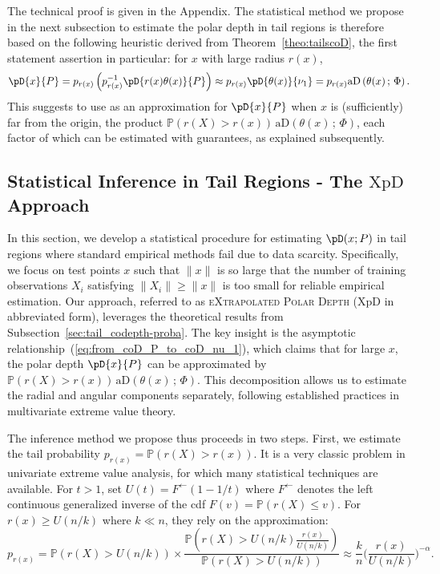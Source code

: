 \documentclass{article}
\numberwithin{equation}{section}
\renewcommand{\P}{\mathbb{P}}
\newcommand{\PP}{\P}%
\newcommand{\XpDsymbol}{\mathrm{XpD}}  %
\newcommand{\XpD}{\ensuremath{\XpDsymbol}}
\newcommand{\coD}[2]{\pD{#1}{#2}}
\newcommand{\aD}[2]{{\mathrm{aD}}\left({#1}\,;\,{#2}\right)}
\begin{document}
The technical proof is given in the Appendix. The statistical method
we propose in the next subsection to estimate the polar depth in tail
regions is therefore based on the following heuristic derived from
Theorem~\ref{theo:tailscoD}, the first statement assertion in
particular: for $x$
with large radius $r(x)$,
\begin{equation}\label{eq:from_coD_P_to_coD_nu_1}
    \coD{x}{P} = p_{r(x)} \left(p_{r(x)}^{-1} \coD{r(x)
    \theta(x)}{P} \right)
    \approx  p_{r(x)}  \coD{\theta(x)}{\nu_1}  = p_{r(x)}  \aD{\theta(x)}{\Phi}.
\end{equation}
This suggests to use
as an approximation for $\coD{x}{P}$
when $x$ is (sufficiently) far from the origin, the product $
\PP(r(X)>r(x))\, \aD{\theta(x)}{\Phi} $, each factor of which can be
estimated with guarantees, as explained subsequently.  %


\subsection{Statistical Inference in Tail Regions - The $\XpD$
Approach}\label{sec:tail-codepth-stats}

In this section, we develop a statistical procedure for estimating
$\pD(x ; P)$ in tail regions where standard empirical methods fail due
to data scarcity. Specifically, we focus on test points $x$ such
that $\|x\|$ is so large that the number of training
observations $X_i$ satisfying $\|X_i\| \ge \|x\|$ is too small for
reliable empirical estimation. Our approach, referred to as
\textsc{eXtrapolated Polar Depth} ($\XpD$ in abbreviated form),
leverages the theoretical results from
Subsection~\ref{sec:tail_codepth-proba}. The key insight is the
asymptotic relationship~(\ref{eq:from_coD_P_to_coD_nu_1}), which
claims that for large $x$, the polar depth $\coD{x}{P}$ can be
approximated by $\PP(r(X)>r(x))\, \aD{\theta(x)}{\Phi}$. This
decomposition allows us to estimate the radial and angular
components separately, following established practices in
multivariate extreme value theory.

The inference method we propose thus proceeds in two steps. First, we estimate
the tail probability $p_{r(x)} = \PP(r(X)>r(x))$. It is a very
classic problem in
univariate extreme value analysis, for which many statistical
techniques are available. For $t>1$, set $U(t)=F^{\leftarrow}(1-1/t)$
where $F^{\leftarrow}$ denotes the left continuous generalized
inverse of the cdf $F(v)=\PP(r(X)\leq v)$.  For $r(x) \ge U(n/k)$ where $k
\ll n$, they rely on the approximation:
\begin{equation*}
    p_{r(x)}  = \PP(r(X)>U(n/k))\times \frac{\PP(r(X) >
    U(n/k)\frac{r(x)}{U(n/k)} )}{ \PP(r(X)>U(n/k))}
    \approx  \frac{k}{n} \Big( \frac{r(x) }{ U(n/k)}\Big)^{-\alpha}.
\end{equation*}
\end{document}
